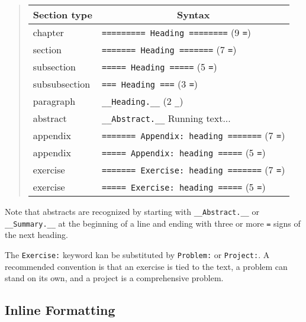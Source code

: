 \documentclass[%
oneside,                 %
final,                   %
10pt]{article}
\begin{document}
\begin{quote}\begin{tabular}{ll}
\hline
\multicolumn{1}{c}{ Section type } & \multicolumn{1}{c}{ Syntax } \\
\hline
chapter                                               & \Verb!========= Heading ========! (9 \Verb!=!)        \\
section                                               & \Verb!======= Heading =======!    (7 \Verb!=!)        \\
subsection                                            & \Verb!===== Heading =====!        (5 \Verb!=!)        \\
subsubsection                                         & \Verb!=== Heading ===!            (3 \Verb!=!)        \\
paragraph                                             & \Verb!__Heading.__!               (2 \Verb!_!)        \\
abstract                                              & \Verb!__Abstract.__! Running text...                  \\
appendix                                              & \Verb!======= Appendix: heading =======! (7 \Verb!=!) \\
appendix                                              & \Verb!===== Appendix: heading =====! (5 \Verb!=!)     \\
exercise                                              & \Verb!======= Exercise: heading =======! (7 \Verb!=!) \\
exercise                                              & \Verb!===== Exercise: heading =====! (5 \Verb!=!)     \\
\hline
\end{tabular}\end{quote}

\noindent
Note that abstracts are recognized by starting with \Verb!__Abstract.__! or
\Verb!__Summary.__! at the beginning of a line and ending with three or
more \Verb!=! signs of the next heading.

The \Verb!Exercise:! keyword kan be substituted by \Verb!Problem:! or \Verb!Project:!.
A recommended convention is that an exercise is tied to the text,
a problem can stand on its own, and a project is a comprehensive
problem.

\subsection{Inline Formatting}
\end{document}
